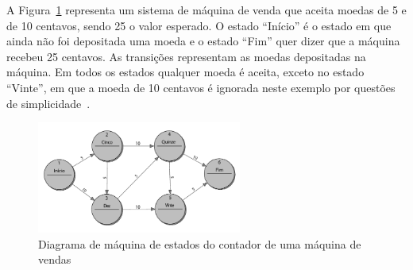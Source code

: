 A Figura~\ref{fig:fsm_2} representa um sistema de máquina de venda que aceita moedas de 5 e de 10 centavos, sendo 25 o valor esperado. O estado ``Início'' é o estado em que ainda não foi depositada uma moeda e o estado ``Fim'' quer dizer que a máquina recebeu 25 centavos. As transições representam as moedas depositadas na máquina. Em todos os estados qualquer moeda é aceita, exceto no estado ``Vinte'', em que a moeda de 10 centavos é ignorada neste exemplo por questões de simplicidade~\cite{wagner:2006}.

\begin{figure}[ht]
	\caption{\label{fig:fsm_2}Diagrama de máquina de estados do contador de uma máquina de vendas}
	\begin{center}
	    \includegraphics[width=0.6\textwidth]{resources/fsm_wagner}
	\end{center}
\end{figure}





